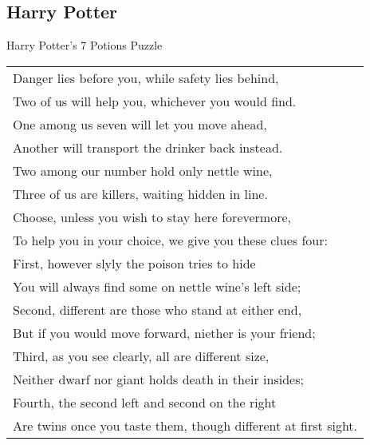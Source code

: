 \documentclass[12pt]{beamer}
\begin{document}
\subsection{Harry Potter}
\begin{frame}{Harry Potter's 7 Potions Puzzle}
	\footnotesize
	\begin{tabular}{l}
		Danger lies before you, while safety lies behind, \\
		Two of us will help you, whichever you would find. \\
		One among us seven will let you move ahead, \\
		Another will transport the drinker back instead. \\
		Two among our number hold only nettle wine, \\
		Three of us are killers, waiting hidden in line. \\
		Choose, unless you wish to stay here forevermore, \\
		To help you in your choice, we give you these clues four: \\
		First, however slyly the poison tries to hide \\
		You will always find some on nettle wine's left side; \\
		Second, different are those who stand at either end, \\
		But if you would move forward, niether is your friend; \\
		Third, as you see clearly, all are different size, \\
		Neither dwarf nor giant holds death in their insides; \\
		Fourth, the second left and second on the right \\
		Are twins once you taste them, though different at first sight.	 \\
	\end{tabular}
\end{frame}
\end{document}
